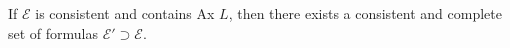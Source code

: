 If $\mathcal{E}$ is consistent and contains Ax $L$, then there exists a consistent and complete set of formulas $\mathcal{E}' \supset \mathcal{E}$.
